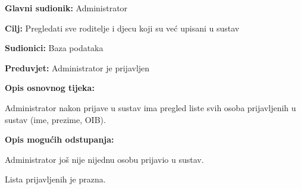 						\noindent {}
					\begin{packed_item}
						
						\item \textbf{Glavni sudionik: }Administrator
						\item  \textbf{Cilj:} Pregledati sve roditelje i djecu koji su već upisani u sustav
						\item  \textbf{Sudionici:} Baza podataka
						\item  \textbf{Preduvjet:} Administrator je prijavljen
						\item  \textbf{Opis osnovnog tijeka:}
						
						\item[] \begin{packed_enum}
							
							\item Administrator nakon prijave u sustav ima pregled liste svih osoba prijavljenih u sustav (ime, prezime, OIB).
						\end{packed_enum}
						
						\item  \textbf{Opis mogućih odstupanja:}
						
						\item[] \begin{packed_item}
							
							\item[4.a] Administrator još nije nijednu osobu prijavio u sustav.
							\item[] \begin{packed_enum}
								
								\item Lista prijavljenih je prazna.
							\end{packed_enum}
							
							
						\end{packed_item}
						
						
					\end{packed_item}
					
